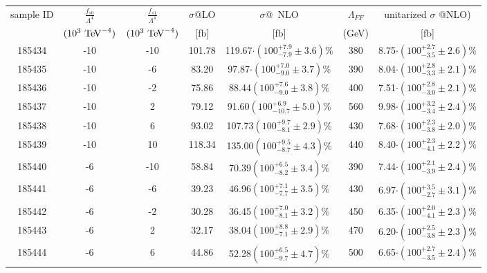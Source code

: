 \begin{table}[ht!]
  \centering
  {
\renewcommand{\arraystretch}{1.3}
\begin{tabular}{c|c|c|c|c|c|c}
  \hline
  sample ID & $\frac{f_{s0}}{\Lambda^4}  $ & $\frac{f_{s1}}{\Lambda^4} $ & $\sigma$@LO & $\sigma$@\
NLO & $\Lambda_{FF}$ & unitarized $\sigma$ @NLO)\\
     & $(10^3 \TeV^{-4})$ & $(10^3 \TeV^{-4})$ & [fb] & [fb] &  (GeV) & [fb] \\
\hline
185434 & -10   &  -10 &  101.78  &    119.67$\cdot (100^{+7.9}_{-7.9}\pm 3.6  )$\%  &        380     &           8.75$\cdot (100^{+2.7}_{-3.5}\pm 2.6 )$\% \\
185435 & -10   &  -6  &  83.20    &    97.87$\cdot (100^{+7.0}_{-9.0}\pm 3.7 )$\%   &       390     &           8.04$\cdot (100^{+2.8}_{-3.3}\pm  2.1)$\% \\
185436 &  -10  &  -2  &  75.86   &    88.44$(100^{+7.6}_{-9.0}\pm  3.8)$\%   &        400     &           7.51$\cdot (100^{+2.8}_{-3.0}\pm 2.1)$\% \\
185437 &  -10  &  2   &  79.12   &    91.60$(100^{+6.9}_{-10.7}\pm 5.0  )$\%    &       560     &           9.98$\cdot (100^{+3.2}_{-3.4}\pm 2.4 )$\% \\
185438 &  -10  &  6   &  93.02   &    107.73$(100^{+9.7}_{-8.1}\pm 2.9  )$\%  &        430     &           7.68$\cdot (100^{+2.3}_{-3.8}\pm 2.0)$\% \\
185439 &  -10  &  10  &  118.34  &    135.00$(100^{+9.5}_{-8.7}\pm 4.3 )$\%     &     440     &           8.40$\cdot (100^{+2.3}_{-4.1}\pm 2.2)$\% \\
\hline
185440 & -6    &  -10 &  58.84   &    70.39$(100^{+6.5}_{-8.2}\pm 3.4 )$\%   &        390     &           7.44$\cdot (100^{+2.1}_{-3.9}\pm 2.4 )$\% \\
185441 &  -6   &  -6  &  39.23   &    46.96$(100^{+7.1}_{-7.7}\pm 3.5 )$\%   &        430     &           6.97$\cdot (100^{+3.5}_{-2.7}\pm 3.1 )$\% \\
185442 & -6    &  -2  &  30.28   &    36.45$(100^{+7.0}_{-8.1}\pm 3.2 )$\%   &        450     &           6.35$\cdot (100^{+2.0}_{-4.1}\pm 2.3 )$\% \\
185443 & -6    &  2   &  32.17   &    38.04$(100^{+8.8}_{-7.1}\pm  2.9 )$\%   &        470     &           6.20$\cdot (100^{+2.5}_{-3.8}\pm 2.3)$\% \\
185444 & -6    &  6   &  44.86   &    52.28$(100^{+6.5}_{-9.7}\pm 4.7 )$\%   &        500     &           6.65$\cdot (100^{+2.7}_{-3.5}\pm 2.4 )$\% \\

\end{tabular}}
\end{table}
